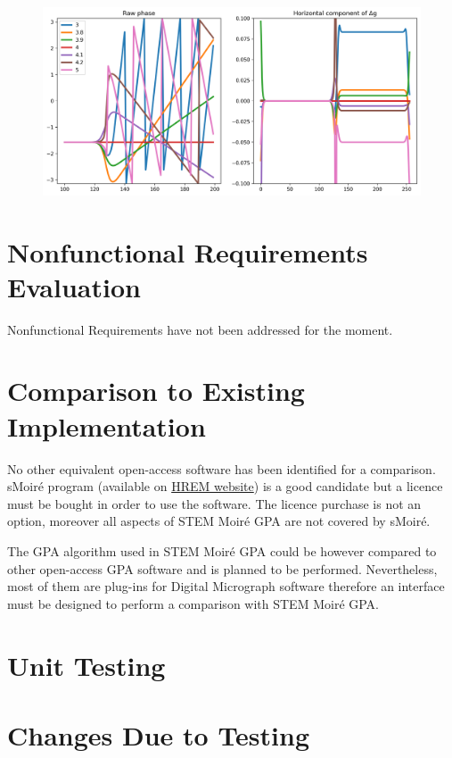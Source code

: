 \documentclass[12pt, titlepage]{article}
\newcommand{\progname}{STEM Moir{\'e} GPA}
\begin{document}
\begin{figure}[H]
\begin{center}
\includegraphics[scale=0.5]{Figures/Test_3_test_results.png}
\caption{}
\label{fig:Test_3_test_results}
\end{center}
\end{figure}

\section{Nonfunctional Requirements Evaluation}

Nonfunctional Requirements have not been addressed for the moment.
	
\section{Comparison to Existing Implementation}	

No other equivalent open-access software has been identified for a comparison. sMoir{\'e} program (available on \href{https://www.hremresearch.com/}{HREM website}) is a good candidate but a licence must be bought in order to use the software. The licence purchase is not an option, moreover all aspects of \progname{} are not covered by sMoir{\'e}.

The GPA algorithm used in \progname{} could be however compared to other open-access GPA software and is planned to be performed. Nevertheless, most of them are plug-ins for Digital Micrograph software therefore an interface must be designed to perform a comparison with \progname{}. 

\section{Unit Testing}



\section{Changes Due to Testing}
\end{document}
